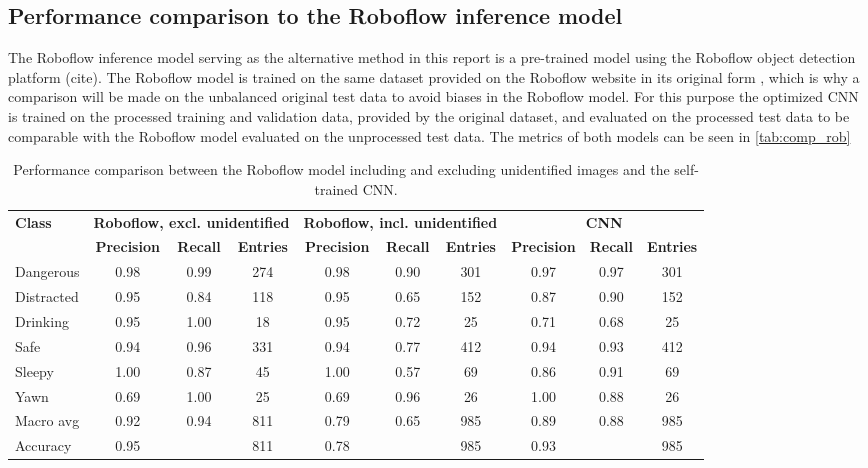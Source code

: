     \subsection{Performance comparison to the Roboflow inference model}
The Roboflow inference model serving as the alternative method in this report is a pre-trained model using the Roboflow object detection platform (cite). The Roboflow model is trained on the same dataset provided on the Roboflow website in its original form \cite{rob_set}, which is why a comparison will be made on the unbalanced original test data to avoid biases in the Roboflow model. For this purpose the optimized CNN is trained on the processed training and validation data, provided by the original dataset, and evaluated on the processed test data to be comparable with the Roboflow model evaluated on the unprocessed test data. 
The metrics of both models can be seen in \autoref{tab:comp_rob}
\begin{table}[H]
    \centering
    \caption{Performance comparison between the Roboflow model including and excluding unidentified images and the self-trained CNN.}
    \vspace{3pt}
    \label{tab:comp_rob}
    \begin{adjustbox}{max width=\textwidth}
    \begin{tabular}{l|cc|c|cc|c|cc|c}
        \toprule
        \textbf{Class} & \multicolumn{3}{c|}{\textbf{Roboflow, excl. unidentified}} & \multicolumn{3}{c|}{\textbf{Roboflow, incl. unidentified}} & \multicolumn{3}{c}{\textbf{CNN}} \\
        \cmidrule{2-10}
         & \textbf{Precision} & \textbf{Recall} & \textbf{Entries} & \textbf{Precision} & \textbf{Recall} & \textbf{Entries} & \textbf{Precision} & \textbf{Recall} & \textbf{Entries} \\
        \midrule
 Dangerous & 0.98 & 0.99 & 274 & 0.98 & 0.90 & 301 & 0.97 & 0.97 & 301 \\
 Distracted & 0.95 & 0.84 & 118 & 0.95 & 0.65 & 152 & 0.87 & 0.90 & 152 \\
 Drinking & 0.95 & 1.00 & 18 & 0.95 & 0.72 & 25 & 0.71 & 0.68 & 25 \\
 Safe & 0.94 & 0.96 & 331 & 0.94 & 0.77 & 412 & 0.94 & 0.93 & 412 \\
 Sleepy & 1.00 & 0.87 & 45 & 1.00 & 0.57 & 69 & 0.86 & 0.91 & 69 \\
 Yawn & 0.69 & 1.00 & 25 & 0.69 & 0.96 & 26 & 1.00 & 0.88 & 26 \\
        \midrule
 Macro avg & 0.92 & 0.94 & 811 & 0.79 & 0.65 & 985 & 0.89 & 0.88 & 985 \\
 Accuracy & 0.95 & \phantom{0} & 811 & 0.78 & \phantom{0} & 985 & 0.93 & \phantom{0} & 985 \\
        \bottomrule
    \end{tabular}
    \end{adjustbox}
\end{table}
